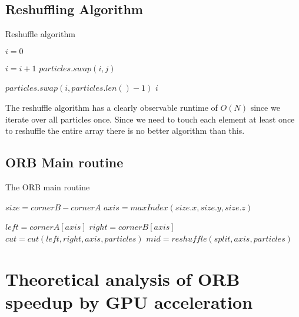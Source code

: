 \documentclass[]{article}
\begin{document}
\subsection{Reshuffling Algorithm}

\begin{algorithm}[H]
	\caption{Reshuffle algorithm}\label{euclid}
	\begin{algorithmic}[1]
		\State $i = 0$
		
		\State $i = i + 1$
		\State $particles.swap(i,j)$
		\EndIf
		\EndFor
		
		\State $particles.swap(i,particles.len() - 1)$
		\State \Return $i$
		\EndProcedure
	\end{algorithmic}
\end{algorithm}

The reshuffle algorithm has a clearly observable runtime of $O(N)$ since we iterate over all particles once. Since we need to touch each element at least once to reshuffle the entire array there is no better algorithm than this.

\subsection{ORB Main routine}

\begin{algorithm}[H]
	\caption{The ORB main routine}\label{euclid}
	\begin{algorithmic}[1]
		\State $size = cornerB - cornerA$
		\State $axis = maxIndex(size.x, size.y, size.z)$ 
		
		\State $left = cornerA[axis]$
		\State $right = cornerB[axis]$
		\newline
		\State $cut = cut(left, right, axis, particles)$
		\State $mid = reshuffle(split, axis, particles)$
		\newline
		
		\State {}
		\EndProcedure
	\end{algorithmic}
\end{algorithm}


\vspace{5mm}


\section{Theoretical analysis of ORB speedup by GPU acceleration}
\end{document}
